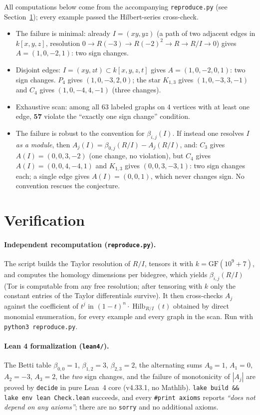 \documentclass[11pt]{article}
\begin{document}
All computations below come from the accompanying \texttt{reproduce.py}
(see Section~\ref{sec:verif}); every example passed the Hilbert-series
cross-check.

\begin{itemize}
\item The failure is minimal: already $I=(xy,yz)$ (a path of two adjacent
edges in $k[x,y,z]$, resolution $0\to R(-3)\to R(-2)^2\to R\to R/I\to0$)
gives $A=(1,0,-2,1)$: two sign changes.
\item Disjoint edges: $I=(xy,zt)\subset k[x,y,z,t]$ gives
$A=(1,0,-2,0,1)$: two sign changes. $P_4$ gives $(1,0,-3,2,0)$;
the star $K_{1,3}$ gives $(1,0,-3,3,-1)$ and $C_4$ gives
$(1,0,-4,4,-1)$ (three changes).
\item Exhaustive scan: among all $63$ labeled graphs on $4$ vertices with at
least one edge, $\mathbf{57}$ violate the ``exactly one sign change''
condition.
\item The failure is robust to the convention for $\beta_{i,j}(I)$. If
instead one resolves $I$ \emph{as a module}, then
$A_j(I)=\beta_{0,j}(R/I)-A_j(R/I)$, and: $C_3$ gives $A(I)=(0,0,3,-2)$
(one change, no violation), but $C_4$ gives $A(I)=(0,0,4,-4,1)$ and
$K_{1,3}$ gives $(0,0,3,-3,1)$: two sign changes each; a single edge gives
$A(I)=(0,0,1)$, which never changes sign. No convention rescues the
conjecture.
\end{itemize}

\section{Verification}
\label{sec:verif}

\paragraph{Independent recomputation (\texttt{reproduce.py}).}
The script builds the Taylor resolution of $R/I$, tensors it with
$k=\mathrm{GF}(10^9{+}7)$, and computes the homology dimensions per
bidegree, which yields $\beta_{i,j}(R/I)$ (Tor is computable from any free
resolution; after tensoring with $k$ only the constant entries of the
Taylor differentials survive). It then cross-checks $A_j$ against the
coefficient of $t^j$ in $(1-t)^n\cdot\operatorname{Hilb}_{R/I}(t)$ obtained
by direct monomial enumeration, for every example and every graph in the
scan. Run with \texttt{python3 reproduce.py}.

\paragraph{Lean 4 formalization (\texttt{lean4/}).}
The Betti table $\beta_{0,0}=1$, $\beta_{1,2}=3$, $\beta_{2,3}=2$, the
alternating sums $A_0=1$, $A_1=0$, $A_2=-3$, $A_3=2$, the \emph{two} sign
changes, and the failure of monotonicity of $|A_j|$ are proved by
\texttt{decide} in pure Lean~4 core (v4.33.1, no Mathlib).
\texttt{lake build \&\& lake env lean Check.lean} succeeds, and every
\texttt{\#print axioms} reports \emph{``does not depend on any axioms''};
there are no \texttt{sorry} and no additional axioms.
\end{document}
